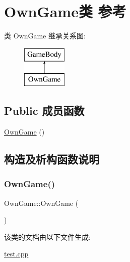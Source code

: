 \hypertarget{class_own_game}{}\section{Own\+Game类 参考}
\label{class_own_game}
类 Own\+Game 继承关系图\+:\begin{figure}[H]
\begin{center}
\leavevmode
\includegraphics[height=2.000000cm]{class_own_game}
\end{center}
\end{figure}
\subsection*{Public 成员函数}
\begin{DoxyCompactItemize}
\item 
\mbox{\hyperlink{class_own_game_a1b06d1ac3962a9347e73a233a2e9ea05}{Own\+Game}} ()
\end{DoxyCompactItemize}


\subsection{构造及析构函数说明}
\mbox{\label{class_own_game_a1b06d1ac3962a9347e73a233a2e9ea05}} 
\subsubsection{\texorpdfstring{OwnGame()}{OwnGame()}}
{\footnotesize\ttfamily Own\+Game\+::\+Own\+Game (\begin{DoxyParamCaption}{ }\end{DoxyParamCaption})\hspace{0.3cm}{\ttfamily [inline]}}



该类的文档由以下文件生成\+:\begin{DoxyCompactItemize}
\item 
\mbox{\hyperlink{test_8cpp}{test.\+cpp}}\end{DoxyCompactItemize}
